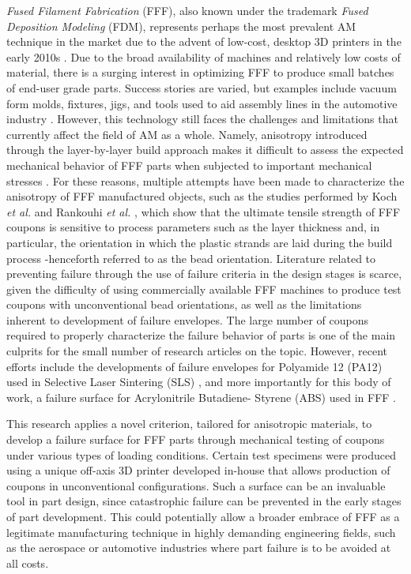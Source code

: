 \documentclass[main.tex]{subfiles}
\begin{document}
\emph{Fused Filament Fabrication} (FFF), also known under the trademark \emph{Fused Deposition Modeling} (FDM\texttrademark), represents perhaps the most prevalent AM technique in the market due to the advent of low-cost, desktop 3D printers in the early 2010s \cite{Capote2017}. Due to the broad availability of machines and relatively low costs of material, there is a surging interest in optimizing FFF to produce small batches of end-user grade parts. Success stories are varied, but examples include vacuum form molds, fixtures, jigs, and tools used to aid assembly lines in the automotive industry \cite{Hartman2014, VanHulle2017,deVries2017}. However, this technology still faces the challenges and limitations that currently affect the field of AM as a whole. Namely, anisotropy introduced through the layer-by-layer build approach makes it difficult to assess the expected mechanical behavior of FFF parts when subjected to important mechanical stresses \cite{Capote2017}. For these reasons, multiple attempts have been made to characterize the anisotropy of FFF manufactured objects, such as the studies performed by Koch \emph{et al.} \cite{Koch2017} and Rankouhi \emph{et al.} \cite{Rankouhi2016}, which show that the ultimate tensile strength of FFF coupons is sensitive to process parameters such as the layer thickness and, in particular, the orientation in which the plastic strands are laid during the build process -henceforth referred to as the bead orientation. Literature related to preventing failure through the use of failure criteria in the design stages is scarce, given the difficulty of using commercially available FFF machines to produce test coupons with unconventional bead orientations, as well as the limitations inherent to development of failure envelopes. The large number of coupons required to properly characterize the failure behavior of parts is one of the main culprits for the small number of research articles on the topic. However, recent efforts include the developments of failure envelopes for Polyamide 12 (PA12) used in Selective Laser Sintering (SLS) \cite{Obst2018}, and more importantly for this body of work,  a failure surface for Acrylonitrile Butadiene- Styrene (ABS) used in FFF \cite{MazzeiCapote2019}. 

This research applies a novel criterion, tailored for anisotropic materials, to develop a failure surface for FFF parts through mechanical testing of coupons under various types of loading conditions. Certain test specimens were produced using a unique off-axis 3D printer developed in-house that allows production of coupons in unconventional configurations. Such a surface can be an invaluable tool in part design, since catastrophic failure can be prevented in the early stages of part development. This could potentially allow a broader embrace of FFF as a legitimate manufacturing technique in highly demanding engineering fields, such as the aerospace or automotive industries where part failure is to be avoided at all costs.
\end{document}
